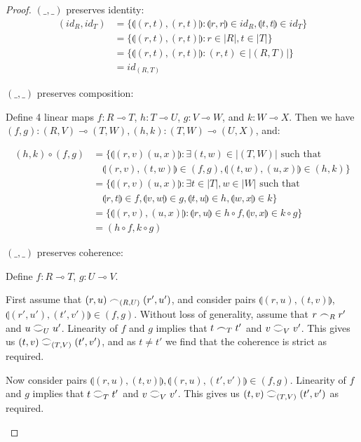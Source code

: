 \documentclass[11pt, oneside]{article}
\theoremstyle{plain}
\theoremstyle{definition}
\newcommand{\lp}{\llparenthesis}
\newcommand{\rp}{\rrparenthesis}
\newcommand{\coh}[1][]{\mathrel{\vcenter{\offinterlineskip\hbox{$\frown$}\vskip0.2ex\hbox{$\smile$}}_{\ifx\\#1\\\else#1\fi}}}
\newcommand{\scoh}[1][]{\mathrel{\frown}_{\ifx\\#1\\\else#1\fi}}
\newcommand{\comp}{\mathbin{\circ}}
\begin{document}
\begin{proof}
    $(\_,\_)$ preserves identity:
    \begin{align*}
        (id_R,id_T) &= \{
            \lp(r,t),(r,t)\rp:\lp r,r\rp\in id_R,\lp t,t\rp\in id_T
        \} \\
        &= \{\lp(r,t),(r,t)\rp:r\in |R|,t\in |T|\} \\
        &= \{\lp(r,t),(r,t)\rp:(r,t)\in|(R,T)|\} \\
        &= id_{(R,T)}
    \end{align*}

    $(\_,\_)$ preserves composition:
    
    \begin{adjustwidth}{1.5em}{}
        Define 4 linear maps
        $f : R\multimap T$,
        $h : T\multimap U$,
        $g : V\multimap W$,
    and $k : W\multimap X$.
    Then we have $(f,g):(R,V)\multimap(T,W),(h,k):(T,W)\multimap(U,X)$, and:
    \end{adjustwidth}

    \begin{align*}
        (h,k)\comp(f,g) &= \{
            \lp(r,v)(u,x)\rp:\exists(t,w)\in|(T,W)| \text{ such that}\\
            &\quad\lp(r,v),(t,w)\rp\in(f,g),\lp(t,w),(u,x)\rp\in(h,k)
        \} \\
        &= \{
            \lp(r,v)(u,x)\rp:\exists t\in|T|,w\in|W| \text{ such that} \\
            &\quad\lp r,t\rp\in f,\lp v,w\rp\in g,\lp t,u\rp\in h,\lp w,x\rp\in k
        \} \\
        &= \{
            \lp(r,v),(u,x)\rp:\lp r,u\rp\in h\comp f,\lp v,x\rp\in k\comp g
        \} \\
        &= (h\comp f,k\comp g)
    \end{align*}

    $(\_,\_)$ preserves coherence:

    \begin{adjustwidth}{1.5em}{}
        Define $f:R\multimap T$, $g:U\multimap V$.

        First assume that $(r,u)\scoh[(R,U)](r',u')$, and consider pairs $\lp(r,u),(t,v)\rp$, $\lp(r',u'),(t',v')\rp\in(f,g)$.
        Without loss of generality, assume that $r\scoh[R]r'$ and $u\coh[U]u'$.
        Linearity of $f$ and $g$ implies that $t\scoh[T]t'$ and $v\coh[V]v'$.
        This gives us $(t,v)\coh[(T,V)](t',v')$, and as $t\neq t'$ we find that the coherence is strict as required.

        Now consider pairs $\lp(r,u),(t,v)\rp,\lp(r,u),(t',v')\rp\in(f,g)$.
        Linearity of $f$ and $g$ implies that $t\coh[T]t'$ and $v\coh[V]v'$.
        This gives us $(t,v)\coh[(T,V)](t',v')$ as required.

    \end{adjustwidth}

\end{proof}
\end{document}
